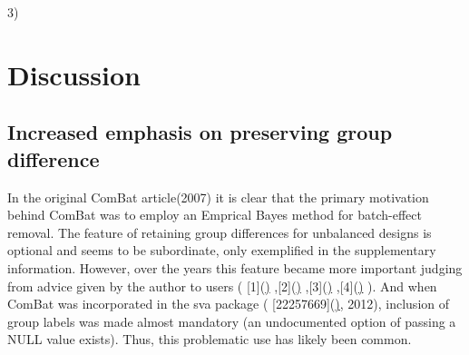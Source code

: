 \documentclass{bio}
\begin{document}


3) 


\section{Discussion}

\subsection{Increased emphasis on preserving group difference}

In the original ComBat article(2007) it is clear that the primary motivation behind ComBat was to employ an Emprical Bayes method for batch-effect removal. The feature of retaining group differences for unbalanced designs is optional and seems to be subordinate, only exemplified in the supplementary information. However, over the years this feature became more important judging from advice given by the author to users
(
[1](\href{https://groups.google.com/d/msg/combat-user-forum/eSVSKwGtuyE/ZIWV2juYmmAJ})
,[2](\href{https://groups.google.com/d/msg/combat-user-forum/Vkb9p7wekd4/h5Etie7FTVQJ})
,[3](\href{https://groups.google.com/d/msg/combat-user-forum/fpBTcgDjiR8/uo4QIZL4sZgJ})
,[4](\href{https://groups.google.com/d/msg/combat-user-forum/26FZlgU2LFQ/W6U_Lhh_64EJ})
).   
And when ComBat was incorporated in the sva package ( [22257669](\href{http://bioinformatics.oxfordjournals.org/cgi/pmidlookup?view=long&pmid=22257669}), 2012), inclusion of group labels was made almost mandatory (an undocumented option of passing a NULL value exists). Thus, this problematic use has likely been common.
\end{document}

